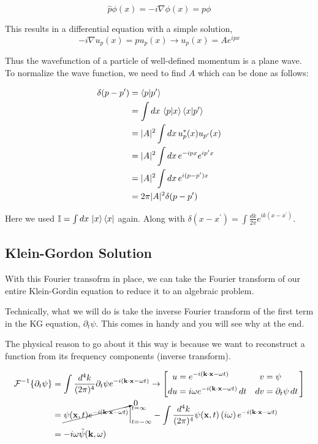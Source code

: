 $$
\hat{p} \phi(x) = -i\nabla \phi(x) = p\phi
$$

This results in a differential equation with a simple solution,
$$
-i\nabla u_p(x) = p u_p(x) \rightarrow u_p(x) = Ae^{ipx}
$$

Thus the wavefunction of a particle of well-defined momentum is a plane wave.
To normalize the wave function, we need to find $A$ which can be done as follows:

\begin{align*}
\delta(p - p^\prime) &= \braket{p | p^\prime} \\
&= \int dx \, \braket{p | x} \braket{x | p^\prime} \\
&= |A|^2 \int dx \, u_{p}^{*} (x) u_{p^\prime} (x) \\
&= |A|^2 \int dx \, e^{-ipx} e^{ip^\prime x} \\
&= |A|^2 \int dx \, e^{i(p - p^\prime) x} \\
&= 2\pi |A|^2 \delta(p - p^\prime)
\end{align*}

Here we used $\mathbb{I} = \int dx \, \ket{x}\bra{x}$ again.
Along with $\delta(x-x^\prime) = \int \frac{dk}{2\pi} e^{ik(x-x^\prime)}$.










\subsection{Klein-Gordon Solution}

With this Fourier transofrm in place, we can take the Fourier transform of our entire
Klein-Gordin equation to reduce it to an algebraic problem.

Technically, what we will do is take the inverse Fourier transform of the first term in the KG equation,
$\partial_t \psi$.
This comes in handy and you will see why at the end.

The physical reason to go about it this way is because we want to reconstruct a function from its frequency
components (inverse transform).

\begin{align*}
\mathcal{F}^{-1}\{ \partial_t \psi \} &=
    \int \frac{d^4k}{(2\pi)^4} \partial_t \psi e^{-i(\boldsymbol{\mathbf{k}}\cdot\boldsymbol{\mathbf{x}} - \omega t)}
\rightarrow
\left[
    \begin{alignedat}{2}
        u  &= e^{-i(\boldsymbol{\mathbf{k}}\cdot\boldsymbol{\mathbf{x}} - \omega t)}                \quad & v  &= \psi \\
        du &= i\omega e^{-i(\boldsymbol{\mathbf{k}}\cdot\boldsymbol{\mathbf{x}} - \omega t)} \, dt  \quad & dv &= \partial_t \psi \, dt
    \end{alignedat}\,
\right] \\
&= \cancelto{0}{ \psi(\boldsymbol{\mathbf{x}}, t) e^{-i(\boldsymbol{\mathbf{k}}\cdot\boldsymbol{\mathbf{x}} - \omega t)} } \Big|_{t=-\infty}^{t=\infty}
    - \int \frac{d^4k}{(2\pi)^4} \psi(\boldsymbol{\mathbf{x}}, t) \left(i\omega\right) e^{-i(\boldsymbol{\mathbf{k}}\cdot\boldsymbol{\mathbf{x}} - \omega t)} \\
&= -i\omega \tilde{\psi} (\boldsymbol{\mathbf{k}}, \omega)
\end{align*}

